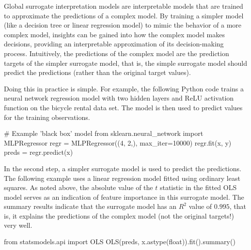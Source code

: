 Global surrogate interpretation models are interpretable models that are trained to approximate the predictions of a complex model. By training a simpler model (like a decision tree or linear regression model) to mimic the behavior of a more complex model, insights can be gained into how the complex model makes decisions, providing an interpretable approximation of its decision-making process. Intuitively, the predictions of the complex model are the prediction targets of the simpler surrogate model, that is, the simple surrogate model should predict the predictions (rather than the original target values).

Doing this in practice is simple. For example, the following Python code trains a neural network regression model with two hidden layers and ReLU activation function on the bicycle rental data set. The model is then used to predict values for the training observations.

\begin{pythoncode}
# Example 'black box' model
from sklearn.neural_network import MLPRegressor
regr = MLPRegressor((4, 2,), max_iter=10000)
regr.fit(x, y)
preds = regr.predict(x)
\end{pythoncode}

In the second step, a simpler surrogate model is used to predict the predictions. The following example uses a linear regression model fitted using ordinary least squares. As noted above, the absolute value of the $t$ statistic in the fitted OLS model serves as an indication of feature importance in this surrogate model. The summary results indicate that the surrogate model has an $R^2$ value of $0.995$, that is, it explains the predictions of the complex model (not the original targets!) very well. 

\begin{pythoncode}
from statsmodels.api import OLS
OLS(preds, x.astype(float)).fit().summary()
\end{pythoncode}

